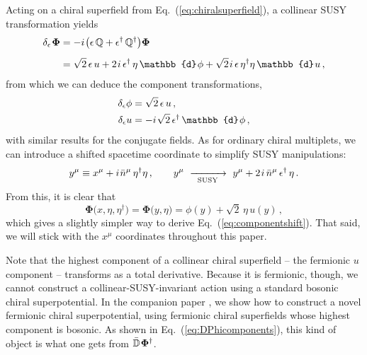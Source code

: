\documentclass[12pt,document,nofootinbib,superscriptaddress,onecolumn,preprintnumbers,balancelastpage]{article}
\newcommand{\s}{\hspace{0.8pt}}
\newcommand{\PP}{\mathbb{d}}
\newcommand{\susy}{\,\,\xrightarrow[\hspace{5pt}\text{SUSY}\hspace{5pt}]{}\,\,}
\DeclareRobustCommand{\Eq}[1]{Eq.~(\ref{#1})}
\newcommand{\D}{\mathbb{D}}
\newcommand{\Q}{\mathbb{Q}}
\newcommand{\bPhi}{\boldsymbol{\Phi}}
\begin{document}
\begin{spacing}{1.2}
Acting on a chiral superfield from \Eq{eq:chiralsuperfield}, a collinear SUSY transformation yields
\begin{align}
\label{eq:susyvariation}
\delta_\epsilon\s \bPhi & = - i\s \big(\epsilon\, \Q + \epsilon^\dagger\, \Q^\dagger \big) \bPhi \nonumber \\[5pt]
 & = \sqrt{2} \, \epsilon \, u + 2 \s i \, \epsilon^\dagger\, \eta\,  \PP\s \phi + \sqrt{2}\s i \, \epsilon \, \eta^\dagger \eta \, \PP \s u\,,
\end{align}
from which we can deduce the component transformations, 
\begin{align}
\delta_\epsilon \phi &= \sqrt{2} \, \epsilon \, u\,, \nonumber \\
\delta_\epsilon u &= - i\s\sqrt{2} \, \epsilon^\dagger\, \PP \s\phi\,,
\label{eq:componentshift}
\end{align}
with similar results for the conjugate fields.
%
As for ordinary chiral multiplets, we can introduce a shifted spacetime coordinate to simplify SUSY manipulations:
%
\begin{equation}
y^\mu \equiv x^\mu + i \s\bar{n}^\mu\, \eta^\dagger \eta\,,  \qquad y^\mu \susy y^\mu + 2\s i\, \bar{n}^\mu\, \epsilon^\dagger\, \eta\,.
\end{equation}
%
From this, it is clear that
%
\begin{equation}
\boldsymbol{\Phi}\big(x,\eta,\eta^\dagger\big) =\boldsymbol{\Phi}\big(y,\eta\big) = \phi(y) + \sqrt{2} \, \eta \, u(y)\,,
\end{equation}
%
which gives a slightly simpler way to derive \Eq{eq:componentshift}.  That said, we will stick with the $x^\mu$ coordinates throughout this paper.

Note that the highest component of a collinear chiral superfield -- the fermionic $u$ component -- transforms as a total derivative.
%
Because it is fermionic, though, we cannot construct a collinear-SUSY-invariant action using a standard bosonic chiral superpotential.
%
In the companion paper \cite{Cohen:2019gsc}, we show how to construct a novel fermionic chiral superpotential, using fermionic chiral superfields whose highest component is bosonic.%
%
As shown in \Eq{eq:DPhicomponents}, this kind of object is what one gets from $\bar{\D} \s\bPhi^\dagger$.



\end{spacing}
\end{document}
